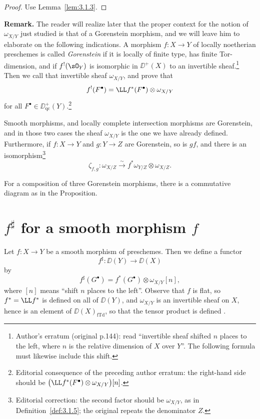\begin{proof}
Use Lemma~\ref{lem:3.1.3}.
\end{proof}

\textbf{Remark.}
The reader will realize later that the proper context for the notion of $\omega_{X/Y}$ just studied is that of a Gorenstein morphism, and we will leave him to elaborate on the following indications. A morphism $f\colon X\to Y$ of locally noetherian preschemes is called \emph{Gorenstein} if it is locally of finite type, has finite Tor-dimension, and if $f^!(\sO_Y)$ is isomorphic in $\DD^+(X)$ to an invertible sheaf.\footnote{Author's erratum (original p.144): read ``invertible sheaf shifted $n$ places to the left, where $n$ is the relative dimension of $X$ over $Y$''. The following formula must likewise include this shift.} Then we call that invertible sheaf $\omega_{X/Y}$, and prove that
\[
f^!(F^\bullet) = \LL f^*(F^\bullet)\otimes\omega_{X/Y}
\]
for all $F^\bullet\in\DD_{\mathrm{qc}}^+(Y)$.\footnote{Editorial consequence of the preceding author erratum: the right-hand side should be $\bigl(\LL f^*(F^\bullet)\otimes\omega_{X/Y}\bigr)[n]$.}

Smooth morphisms, and locally complete intersection morphisms are Gorenstein, and in those two cases the sheaf $\omega_{X/Y}$ is the one we have already defined. Furthermore, if $f\colon X\to Y$ and $g\colon Y\to Z$ are Gorenstein, so is $gf$, and there is an isomorphism\footnote{Editorial correction: the second factor should be $\omega_{X/Y}$, as in Definition~\ref{def:3.1.5}; the original repeats the denominator $Z$.}
\[
\zeta_{f,g}\colon \omega_{X/Z} \xrightarrow{\sim} f^*\omega_{Y/Z}\otimes\omega_{X/Z}.
\]

For a composition of three Gorenstein morphisms, there is a commutative diagram as in the Proposition.

\section{\texorpdfstring{$f^\sharp$}{f sharp} for a smooth morphism \texorpdfstring{$f$}{f}}\label{sec:3.2}

\begin{definition*}
Let $f\colon X\to Y$ be a smooth morphism of preschemes. Then we define a functor
\[
f^{\sharp}\colon \DD(Y) \longrightarrow \DD(X)
\]
by
\[
f^{\sharp}(G^\bullet) = f^*(G^\bullet)\otimes\omega_{X/Y}[n],
\]
where $[n]$ means ``shift $n$ places to the left''. Observe that $f$ is flat, so $f^*=\LL f^*$ is defined on all of $\DD(Y)$, and $\omega_{X/Y}$ is an invertible sheaf on $X$, hence is an element of $\DD(X)_{\mathrm{fTd}}$, so that the tensor product is defined .
\end{definition*}

